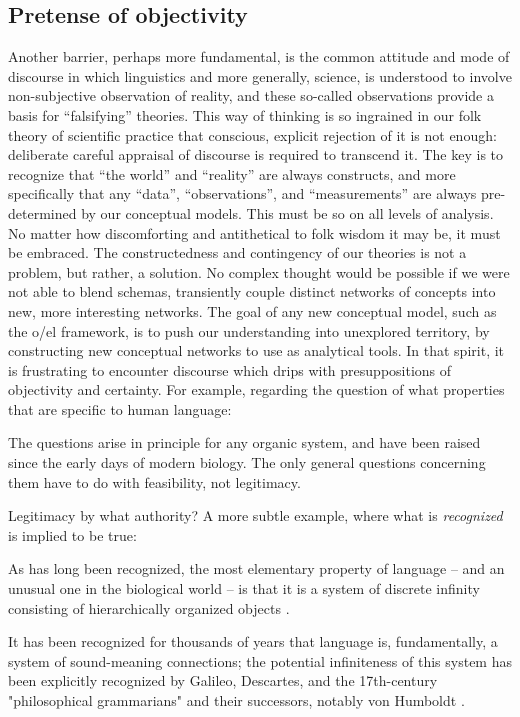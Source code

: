 \subsection{Pretense of objectivity}

Another barrier, perhaps more fundamental, is the common attitude and mode of discourse in which linguistics and more generally, science, is understood to involve non-subjective observation of reality, and these so-called observations provide a basis for “falsifying” theories. This way of thinking is so ingrained in our folk theory of scientific practice that conscious, explicit rejection of it is not enough: deliberate careful appraisal of discourse is required to transcend it. The key is to recognize that “the world” and “reality” are always constructs, and more specifically that any “data”, “observations”, and “measurements” are always pre-determined by our conceptual models. This must be so on all levels of analysis. No matter how discomforting and antithetical to folk wisdom it may be, it must be embraced. The constructedness and contingency of our theories is not a problem, but rather, a solution. No complex thought would be possible if we were not able to blend schemas, transiently couple distinct networks of concepts into new, more interesting networks. The goal of any new conceptual model, such as the o/el framework, is to push our understanding into unexplored territory, by constructing new conceptual networks to use as analytical tools. In that spirit, it is frustrating to encounter discourse which drips with presuppositions of objectivity and certainty. For example, regarding the question of what properties that are specific to human language:

The questions arise in principle for any organic system, and have been raised since the early days of modern biology. The only general questions concerning them have to do with feasibility, not legitimacy. \citep[133]{Chomsky2008}

Legitimacy by what authority? A more subtle example, where what is \textit{recognized} is implied to be true:

As has long been recognized, the most elementary property of language – and an unusual one in the biological world – is that it is a system of discrete infinity consisting of hierarchically organized objects \citep[134]{Chomsky2008}.

It has been recognized for thousands of years that language is, fundamentally, a system of sound-meaning connections; the potential infiniteness of this system has been explicitly recognized by Galileo, Descartes, and the 17th-century "philosophical grammarians" and their successors, notably von Humboldt \citep{HauserEtAl2002}.

